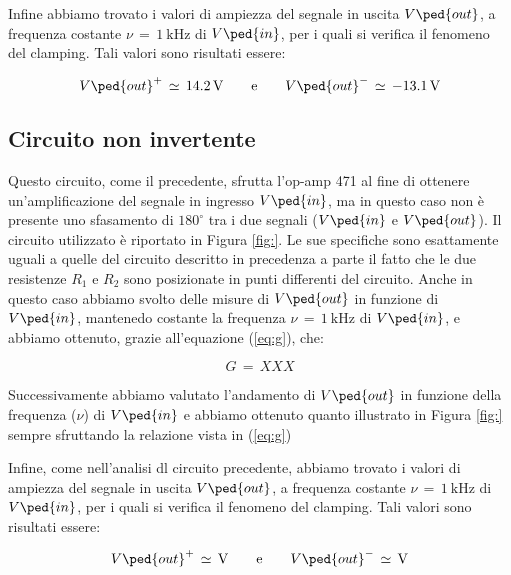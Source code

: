 Infine abbiamo trovato i valori di ampiezza del segnale in uscita $V\ped{out}$, a frequenza costante $\nu\,=\,\SI{1}{\kilo\hertz}$ di $V\ped{in}$, per i quali si verifica il fenomeno del clamping. Tali valori sono risultati essere:

\begin{equation}
        V\ped{out}^+\,\simeq\,\SI{14.2}{\volt} \qquad \text{e} \qquad V\ped{out}^-\,\simeq\,\SI{-13.1}{\volt}
\end{equation}

\subsection*{Circuito non invertente}

Questo circuito, come il precedente, sfrutta l'op-amp 471 al fine di ottenere un'amplificazione del segnale in ingresso $V\ped{in}$, ma in questo caso non è presente uno sfasamento di $180^\circ$ tra i due segnali ($V\ped{in}$ e $V\ped{out}$).
Il circuito utilizzato è riportato in Figura \ref{fig:}. Le sue specifiche sono esattamente uguali a quelle del circuito descritto in precedenza a parte il fatto che le due resistenze $R_1$ e $R_2$ sono posizionate in punti differenti del circuito.
Anche in questo caso abbiamo svolto delle misure di $V\ped{out}$ in funzione di $V\ped{in}$, mantenedo costante la frequenza $\nu\,=\,\SI{1}{\kilo\hertz}$ di $V\ped{in}$, e abbiamo ottenuto, grazie all'equazione (\ref{eq:g}), che:

\begin{equation}
        G\,=\, XXX
\end{equation}

Successivamente abbiamo valutato l'andamento di $V\ped{out}$ in funzione della frequenza ($\nu$) di $V\ped{in}$ e abbiamo ottenuto quanto illustrato in Figura \ref{fig:} sempre sfruttando la relazione vista in (\ref{eq:g})

Infine, come nell'analisi dl circuito precedente, abbiamo trovato i valori di ampiezza del segnale in uscita $V\ped{out}$, a frequenza costante $\nu\,=\,\SI{1}{\kilo\hertz}$ di $V\ped{in}$, per i quali si verifica il fenomeno del clamping. Tali valori sono risultati essere:

\begin{equation}
        V\ped{out}^+\,\simeq\,\SI{}{\volt} \qquad \text{e} \qquad V\ped{out}^-\,\simeq\,\SI{}{\volt}
\end{equation}
















